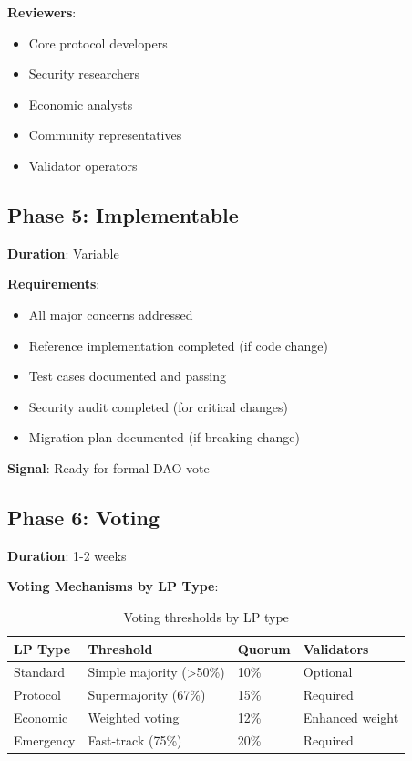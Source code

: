 \textbf{Reviewers}:
\begin{itemize}
\item Core protocol developers
\item Security researchers
\item Economic analysts
\item Community representatives
\item Validator operators
\end{itemize}

\subsection{Phase 5: Implementable}

\textbf{Duration}: Variable

\textbf{Requirements}:
\begin{itemize}
\item All major concerns addressed
\item Reference implementation completed (if code change)
\item Test cases documented and passing
\item Security audit completed (for critical changes)
\item Migration plan documented (if breaking change)
\end{itemize}

\textbf{Signal}: Ready for formal DAO vote

\subsection{Phase 6: Voting}

\textbf{Duration}: 1-2 weeks

\textbf{Voting Mechanisms by LP Type}:

\begin{table}[h]
\centering
\begin{tabular}{@{}llll@{}}
\toprule
\textbf{LP Type} & \textbf{Threshold} & \textbf{Quorum} & \textbf{Validators} \\ \midrule
Standard & Simple majority (>50\%) & 10\% & Optional \\
Protocol & Supermajority (67\%) & 15\% & Required \\
Economic & Weighted voting & 12\% & Enhanced weight \\
Emergency & Fast-track (75\%) & 20\% & Required \\ \bottomrule
\end{tabular}
\caption{Voting thresholds by LP type}
\end{table}

